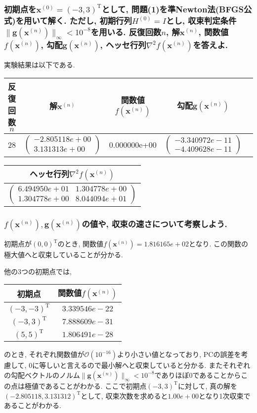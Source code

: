 \documentclass[12pt,a4paper]{jsarticle}
\begin{document}
\subsubsection{初期点を$\bm{x}^{(0)}=(-3, 3)^{\mathrm{T}}$として, 問題(1)を準Newton法(BFGS公式)を用いて解く. ただし, 初期行列$H^{(0)}=I$とし, 収束判定条件$\|\bm{g}(\bm{x}^{(n)})\|_\infty < 10^{-8}$を用いる. 反復回数$n$, 解$\bm{x}^{(n)}$, 関数値$f(\bm{x}^{(n)})$, 勾配$\bm{g}(\bm{x}^{(n)})$, ヘッセ行列$\nabla^2f(\bm{x}^{(n)})$を答えよ.}
実験結果は以下である.
\begin{table}[H]
  \centering
\begin{tabular}{ccccc}
  反復回数$n$ & 解$\bm{x}^{(n)}$ & 関数値$f(\bm{x}^{(n)})$ & 勾配$\bm{g}(\bm{x}^{(n)})$\\ \hline
  28 & $\left(\begin{array}{c} -2.805118e+00 \\ 3.131313e+00\end{array}\right)$ & 0.000000e+00 & $\left(\begin{array}{c} -3.340972e-11 \\ -4.409628e-11\end{array}\right)$
\end{tabular}
\end{table}
\begin{table}[H]
  \centering
\begin{tabular}{c}
  ヘッセ行列$\nabla^2f(\bm{x}^{(n)})$ \\ \hline
  $\left(\begin{array}{cc} 6.494950e+01 & 1.304778e+00 \\1.304778e+00& 8.044094e+01\end{array}\right)$
\end{tabular}
\end{table}


\subsubsection{$f(\bm{x}^{(n)}), \bm{g}(\bm{x}^{(n)})$の値や, 収束の速さについて考察しよう.}
初期点が$(0, 0)^{\mathrm{T}}$のとき, 関数値$f(\bm{x}^{(n)}) = 1.816165e+02$となり. この関数の極大値へと収束していることが分かる.

他の3つの初期点では,
\begin{table}[H]
  \centering
\begin{tabular}{cc}
  初期点 & 関数値$f(\bm{x}^{(n)})$ \\ \hline
  $(-3, -3)^{\mathrm{T}}$ & $3.339546e-22$ \\
  $(-3, 3)^{\mathrm{T}}$ & $7.888609e-31$ \\
  $(5, 5)^{\mathrm{T}}$ & $1.806491e-28$
\end{tabular}
\end{table}
のとき, それぞれ関数値が$\mathcal{O}(10^{-16})$より小さい値となっており, PCの誤差を考慮して, $0$に等しいと言えるので最小解へと収束していると分かる.
またそれぞれの勾配ベクトルのノルム$\|\bm{g}(\bm{x}^{(n)})\|_\infty < 10^{-8}$でありほぼ$0$であることからこの点は極値であることがわかる.
ここで初期点$(-3, 3)^{\mathrm{T}}$に対して, 真の解を$(-2.805118, 3.131312)^{\mathrm{T}}$として, 収束次数を求めると$1.00e+00$となり1次収束であることがわかる.
\end{document}
